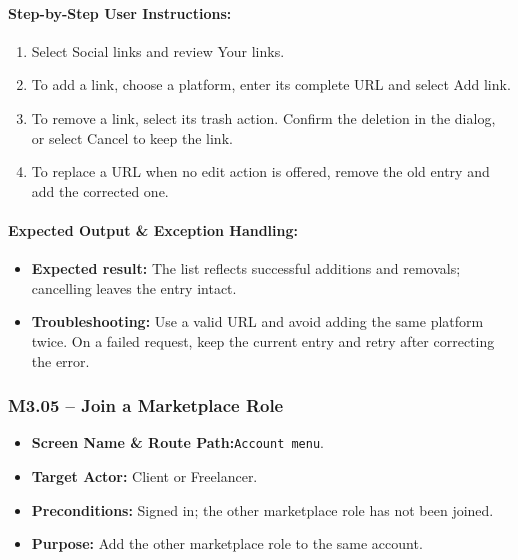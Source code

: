 \paragraph{Step-by-Step User Instructions:}
\begin{enumerate}[leftmargin=1.8em,itemsep=3pt]
  \item {} Select Social links and review Your links.
  \item {} To add a link, choose a platform, enter its complete URL and select Add link.
  \item {} To remove a link, select its trash action. Confirm the deletion in the dialog, or select Cancel to keep the link.
  \item {} To replace a URL when no edit action is offered, remove the old entry and add the corrected one.
\end{enumerate}
\paragraph{Expected Output \& Exception Handling:}
\begin{itemize}[leftmargin=1.5em,itemsep=2pt]
  \item \textbf{Expected result:} The list reflects successful additions and removals; cancelling leaves the entry intact.
  \item \textbf{Troubleshooting:} Use a valid URL and avoid adding the same platform twice. On a failed request, keep the current entry and retry after correcting the error.
\end{itemize}

\newpage
\subsubsection{M3.05 -- Join a Marketplace Role}
\begin{itemize}[leftmargin=1.5em,itemsep=2pt]
  \item \textbf{Screen Name \& Route Path:}\newline \texttt{Account menu}.
  \item \textbf{Target Actor:} Client or Freelancer.
  \item \textbf{Preconditions:} Signed in; the other marketplace role has not been joined.
  \item \textbf{Purpose:} Add the other marketplace role to the same account.
\end{itemize}
